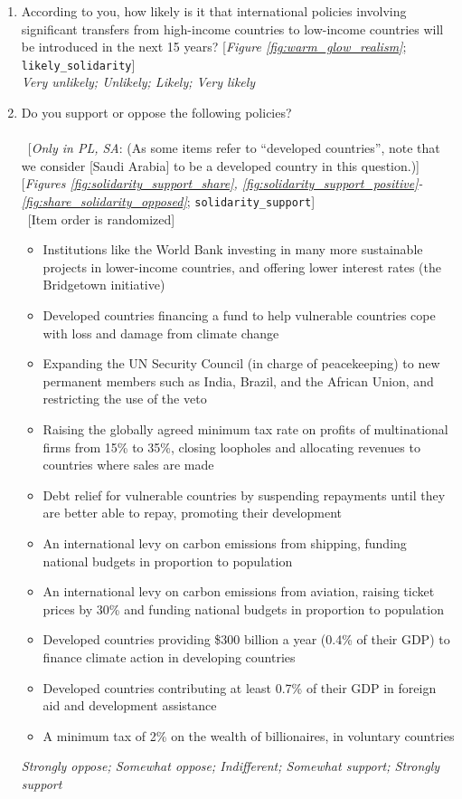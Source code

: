 \begin{enumerate}[resume]
\item  \label{q:likely_solidarity} According to you, how likely is it that international policies involving significant transfers from high-income countries to low-income countries will be introduced in the next 15 years? [\textit{Figure \ref{fig:warm_glow_realism}}; 
\verb|likely_solidarity|]
  \\ \textit{Very unlikely; Unlikely; Likely; Very likely}

\item  \label{q:solidarity_support} Do you support or oppose the following policies?\\
~\\ 
~[\textit{Only in PL, SA}: (As some items refer to ``developed countries'', note that we consider [Saudi Arabia] to be a developed country in this question.)] [\textit{Figures \ref{fig:solidarity_support_share}, \ref{fig:solidarity_support_positive}-\ref{fig:share_solidarity_opposed}}; 
\verb|solidarity_support|] \\
~[Item order is randomized]
\begin{itemize}
    \item Institutions like the World Bank investing in many more sustainable projects in lower-income countries, and offering lower interest rates (the Bridgetown initiative)
    \item Developed countries financing a fund to help vulnerable countries cope with loss and damage from climate change
    \item Expanding the UN Security Council (in charge of peacekeeping) to new permanent members such as India, Brazil, and the African Union, and restricting the use of the veto
    \item Raising the globally agreed minimum tax rate on profits of multinational firms from 15\% to 35\%, closing loopholes and allocating revenues to countries where sales are made
    \item Debt relief for vulnerable countries by suspending repayments until they are better able to repay, promoting their development
    \item An international levy on carbon emissions from shipping, funding national budgets in proportion to population
    \item An international levy on carbon emissions from aviation, raising ticket prices by 30\% and funding national budgets in proportion to population
    \item Developed countries providing \$300 billion a year (0.4\% of their GDP) to finance climate action in developing countries
    \item Developed countries contributing at least 0.7\% of their GDP in foreign aid and development assistance
    \item A minimum tax of 2\% on the wealth of billionaires, in voluntary countries
\end{itemize}
\textit{Strongly oppose; Somewhat oppose; Indifferent; Somewhat support; Strongly support}
\end{enumerate} 

